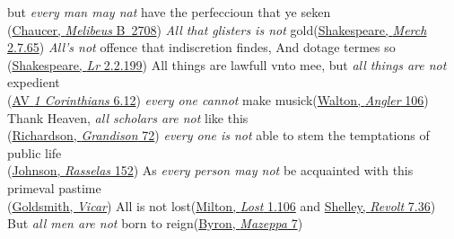 \ea \label{ex:08-36}
\ea
but \emph{every man may nat} have the perfeccioun that ye seken\\\hfill(\href{https://archive.org/details/completeworksofg04chauuoft/completeworksofg04chauuoft/page/226/mode/2up?q=%22every+man+may+nat%22&view=theater}{Chaucer, \textit{Melibeus} B~2708})
\ex{}
\emph{All that glisters is not} gold\hfill(\href{https://internetshakespeare.uvic.ca/doc/MV_F1/scene/2.7/index.html#tln-1035}{Shakespeare, \textit{Merch} 2.7.65})
\ex
\emph{All's not} offence that indiscretion findes, And dotage termes so\\\hfill(\href{https://internetshakespeare.uvic.ca/doc/Lr_F1/scene/2.2/index.html#tln-1485}{Shakespeare, \textit{Lr} 2.2.199}) %
\ex
All things are lawfull vnto mee, but \emph{all things are not} expedient\\\hfill(\href{https://www.kingjamesbibleonline.org/1611_1-Corinthians-6-12/}{AV \textit{1 Corinthians} 6.12})
\ex
\emph{every one cannot} make musick\hfill(\href{https://archive.org/details/bim_early-english-books-1641-1700_the-compleat-angler-_walton-isaac_1655/page/140/mode/2up?q=%22every+one%22&view=theater}{Walton, \textit{Angler} 106})
\ex
Thank Heaven, \emph{all scholars are not} like this\\\hfill(\href{https://archive.org/details/bim_eighteenth-century_sir-charles-grandison-_richardson-samuel_1780_1/page/74/mode/2up?q=%22all+scholars%22&view=theater}{Richardson, \textit{Grandison} 72}) %
\ex
\emph{every one is not} able to stem the temptations of public life\\\hfill(\href{https://archive.org/details/historyrasselas01johngoog/page/n157/mode/2up?q=%22not+able+to+stem%22&view=theater}{Johnson, \textit{Rasselas} 152}) %
\ex {}
As \emph{every person may not} be acquainted with this primeval pastime\\\hfill(\href{https://archive.org/details/TheVicarOfWakefield/page/n129/mode/2up?q=%22every+person+may+not%22&view=theater}{Goldsmith, \textit{Vicar}}) %
\ex
All is not lost\hfill(\href{https://archive.org/details/poeticalworksofj00miltiala/page/184/mode/2up?ref=ol&view=theater&q=%22all+is+not+lost%22}{Milton, \textit{Lost} 1.106} and \href{https://archive.org/details/completepoeticalshel/page/112/mode/2up?view=theater&q=%22all+is+not+lost%22}{Shelley, \textit{Revolt} 7.36})
\ex
But \emph{all men are not} born to reign\hfill(\href{https://archive.org/details/in.ernet.dli.2015.285363/page/n329/mode/2up?q=%22men+are+not+born+to+reign%22&view=theater}{Byron, \textit{Mazeppa} 7})
